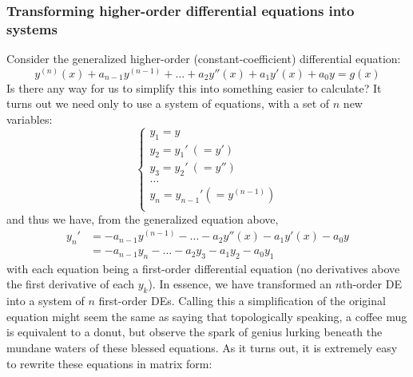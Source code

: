 \documentclass{article}
\begin{document}
\subsubsection{Transforming higher-order differential equations into systems}
Consider the generalized higher-order (constant-coefficient) differential equation:
\begin{equation*}
    y^{(n)}(x)+a_{n-1}y^{(n-1)} + \dots + a_2 y''(x) + a_1y'(x)+a_0 y = g(x)
\end{equation*}
Is there any way for us to simplify this into something easier to calculate? It turns out we need only to use a system of equations, with a set of $n$ new variables:
\begin{equation*}
    \begin{cases}
        y_1 = y \\
        y_2 = y_1'\ (=y') \\
        y_3 = y_2'\ (=y'')\\
        \dots \\
        y_n = y_{n-1}' (=y^{(n-1)}) \\        
    \end{cases}
\end{equation*}
and thus we have, from the generalized equation above, 
\begin{equation*}
    \begin{aligned}
        y_n' &= -a_{n-1}y^{(n-1)} - \dots - a_2 y''(x) - a_1y'(x)-a_0y \\
        &=-a_{n-1}y_n - \dots - a_2y_3 - a_1y_2 - a_0y_1
    \end{aligned}
\end{equation*}
with each equation being a first-order differential equation (no derivatives above the first derivative of each $y_k$). In essence, we have transformed an $n$th-order DE into a system of $n$ first-order DEs. Calling this a simplification of the original equation might seem the same as saying that topologically speaking, a coffee mug is equivalent to a donut, but observe the spark of genius lurking beneath the mundane waters of these blessed equations. As it turns out, it is extremely easy to rewrite these equations in matrix form: 
\end{document}
